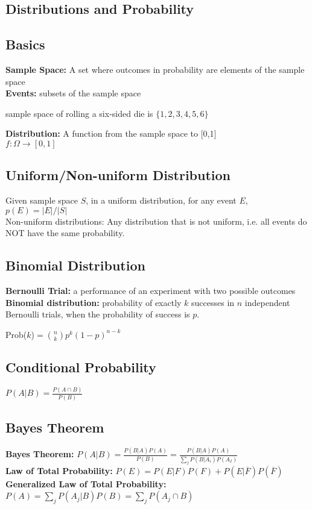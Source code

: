 \documentclass{article}
\begin{document}
\begin{spacing}{1.5}
\section{Distributions and Probability}
\label{sec:probability}
\subsection{Basics}
\label{sec:pbasics}
\textbf{Sample Space:} A set where outcomes in probability are elements of the sample space\\
\textbf{Events:} subsets of the sample space
\begin{center}
    sample space of rolling a six-sided die is $\{1,2,3,4,5,6\}$
\end{center}
\textbf{Distribution:} A function from the sample space to [0,1]\\
$f: \Omega \rightarrow [0,1]$
\subsection{Uniform/Non-uniform Distribution}
\label{sec:uniform}
Given sample space $S$, in a uniform distribution, for any event $E$, $p(E)=|E|/|S|$\\
Non-uniform distributions: Any distribution that is not uniform, i.e. all events do NOT have the same probability.
\subsection{Binomial Distribution}
\label{sec:binomial_distribution}
\textbf{Bernoulli Trial:} a performance of an experiment with two possible outcomes\\
\textbf{Binomial distribution:} probability of exactly $k$ successes in $n$ independent Bernoulli trials, when the probability of success is $p$.
\begin{center}
Prob($k$)$ = \binom{n}{k}p^k(1-p)^{n-k}$
\end{center}
\subsection{Conditional Probability}
$P(A|B) = \frac{P(A \cap B)}{P(B)}$
\subsection{Bayes Theorem}
\label{sec:bayes}
\textbf{Bayes Theorem:}
$P(A|B) = \frac{P(B|A)P(A)}{P(B)}=\frac{P(B|A)P(A)}{\sum_jP(B|A_i)P(A_I)}$\\
\textbf{Law of Total Probability:} $P(E) = P(E|F)P(F) + P(E|\overline{F})P(\overline{F})$\\
\textbf{Generalized Law of Total Probability:} $P(A) = \sum_jP(A_j|B)P(B)=\sum_jP(A_j \cap B)$
\label{sec:conditional}

\end{spacing}
\end{document}
